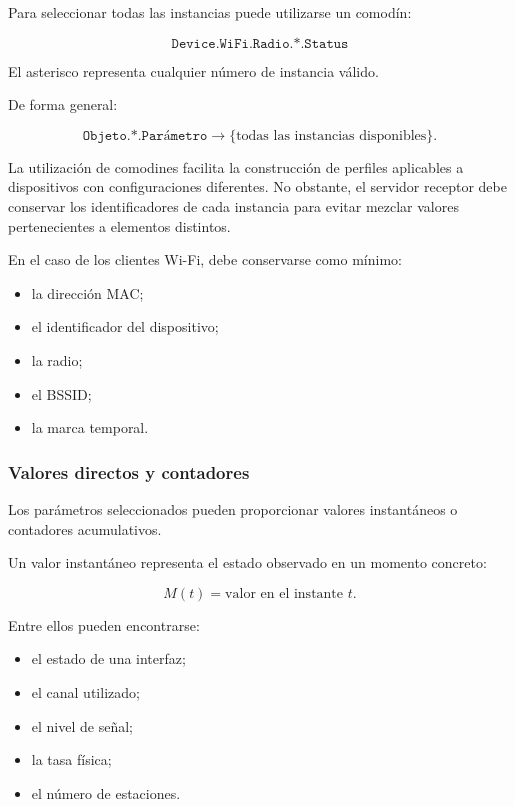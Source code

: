 Para seleccionar todas las instancias puede utilizarse un comodín:

\[
    \texttt{Device.WiFi.Radio.*.Status}
\]

El asterisco representa cualquier número de instancia válido.

De forma general:

\[
    \texttt{Objeto.*.Parámetro}
    \longrightarrow
    \{
        \text{todas las instancias disponibles}
    \}.
\]

La utilización de comodines facilita la construcción de perfiles
aplicables a dispositivos con configuraciones diferentes. No obstante,
el servidor receptor debe conservar los identificadores de cada
instancia para evitar mezclar valores pertenecientes a elementos
distintos.

En el caso de los clientes Wi-Fi, debe conservarse como mínimo:

\begin{itemize}
    \item la dirección MAC;

    \item el identificador del dispositivo;

    \item la radio;

    \item el BSSID;

    \item la marca temporal.
\end{itemize}


\subsubsection*{Valores directos y contadores}

Los parámetros seleccionados pueden proporcionar valores instantáneos o
contadores acumulativos.

Un valor instantáneo representa el estado observado en un momento
concreto:

\[
    M(t)
    =
    \text{valor en el instante } t.
\]

Entre ellos pueden encontrarse:

\begin{itemize}
    \item el estado de una interfaz;

    \item el canal utilizado;

    \item el nivel de señal;

    \item la tasa física;

    \item el número de estaciones.
\end{itemize}

